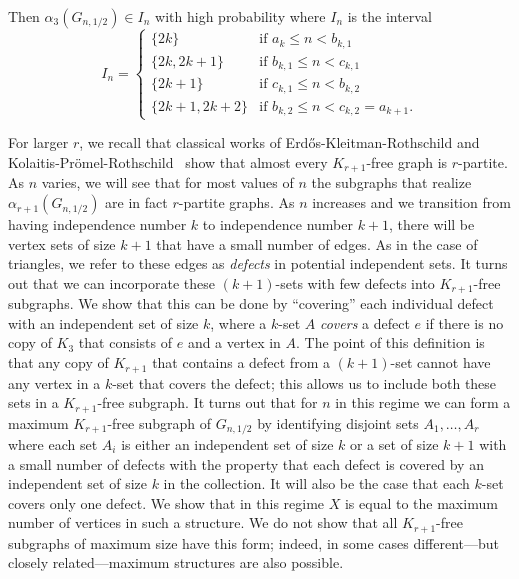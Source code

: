 \documentclass[11pt]{article}
\theoremstyle{definition}
\theoremstyle{remark}
\begin{document}
Then $\alpha_3(G_{n,1/2}) \in I_n$ with high probability where $I_n$ is the interval \begin{equation*}
    I_n = \begin{cases}
        \{2k\} &\text{if } a_k \leq n < b_{k,1} \\
        \{2k, 2k + 1\} &\text{if }b_{k,1} \leq n < c_{k,1} \\
        \{2k+1\} & \text{if }c_{k,1}\leq n < b_{k,2} \\
        \{2k+1,2k+2\} & \text{if }b_{k,2}\leq n < c_{k,2}  = a_{k+1}.
    \end{cases} 
\end{equation*}



For larger $r$, we recall that classical works of Erd\H{o}s-Kleitman-Rothschild \cite{EKR} and  Kolaitis-Pr\"omel-Rothschild~\cite{KPR} show that almost every $K_{r+1}$-free graph is $r$-partite.  
As $n$ varies, we will see that for most values of $n$ the subgraphs that realize $\alpha_{r+1}(G_{n,1/2})$ are in fact $r$-partite graphs.  As $n$ increases and we transition from having independence number $k$ to independence number $k+1$, there will be vertex sets of size $k+1$ that have a small number of edges.  As in the case of triangles, we refer to these edges as \emph{defects} in potential independent sets. It turns out that we can incorporate these $(k+1)$-sets with few defects into $K_{r+1}$-free subgraphs. We show
that this can be done by ``covering'' each individual defect with an independent set of size $k$, where a $k$-set $A$ \emph{covers} a
defect $e$ if there is no copy of $K_3$ that consists of $e$ and a vertex in $A$. The point of this definition is that any copy of $K_{r+1}$ that contains a defect from a $(k+1)$-set cannot have any vertex in a $k$-set that covers the defect; this allows us to include both these sets in a $K_{r+1}$-free subgraph. It turns out that for $n$ in this regime we can form a maximum $K_{r+1}$-free subgraph of $G_{n,1/2}$ by identifying disjoint sets $A_1, \dots, A_r$ where each set $A_i$ is either an independent set of size $k$ or a set of size $k+1$ with a small number of defects with the property that each defect is covered by an independent set of size $k$ in the collection.  It will also be the case that each $k$-set covers only one defect. We show that in this regime $X$ is equal to the maximum
number of vertices in such a structure.  We do not show that all $K_{r+1}$-free subgraphs of maximum size have this form; indeed, in some cases different---but closely related---maximum structures are also possible.
\end{document}
